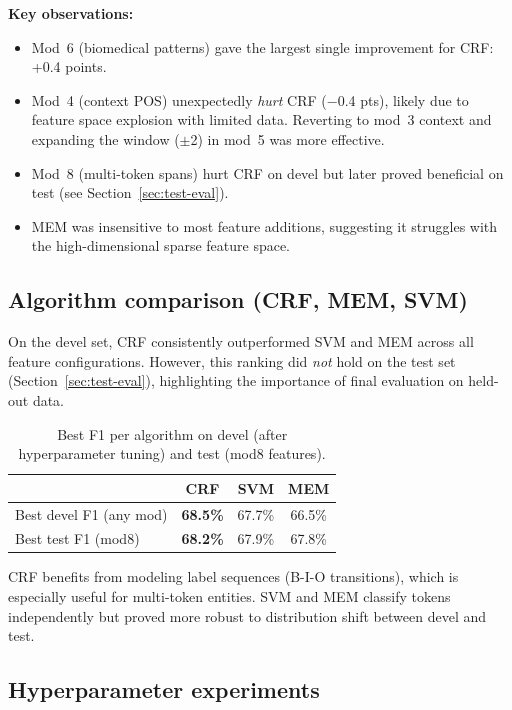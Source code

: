 \documentclass[a4paper,12pt]{article}
\newcommand{\callout}[1]{\textbf{\textcolor{tabgreen}{#1}}}
\begin{document}
\callout{Key observations:}
\begin{itemize}[nosep]
    \item Mod~6 (biomedical patterns) gave the largest single improvement for CRF: +0.4 points.
    \item Mod~4 (context POS) unexpectedly \emph{hurt} CRF ($-$0.4 pts), likely due to feature space explosion with limited data. Reverting to mod~3 context and expanding the window ($\pm$2) in mod~5 was more effective.
    \item Mod~8 (multi-token spans) hurt CRF on devel but later proved beneficial on test (see Section~\ref{sec:test-eval}).
    \item MEM was insensitive to most feature additions, suggesting it struggles with the high-dimensional sparse feature space.
\end{itemize}

\subsection{Algorithm comparison (CRF, MEM, SVM)}

On the devel set, CRF consistently outperformed SVM and MEM across all feature configurations. However, this ranking did \emph{not} hold on the test set (Section~\ref{sec:test-eval}), highlighting the importance of final evaluation on held-out data.

\begin{table}[H]
\centering
\begin{tabular}{l c c c}
\hline
 & \textbf{CRF} & \textbf{SVM} & \textbf{MEM} \\
\hline
Best devel F1 (any mod) & \cellcolor{green!15}\textbf{68.5\%} & 67.7\% & 66.5\% \\
Best test F1 (mod8) & \cellcolor{green!15}\textbf{68.2\%} & 67.9\% & 67.8\% \\
\hline
\end{tabular}
\caption{Best F1 per algorithm on devel (after hyperparameter tuning) and test (mod8 features).}
\label{tab:algo-comparison}
\end{table}

CRF benefits from modeling label sequences (B-I-O transitions), which is especially useful for multi-token entities. SVM and MEM classify tokens independently but proved more robust to distribution shift between devel and test.

\subsection{Hyperparameter experiments}
\end{document}
